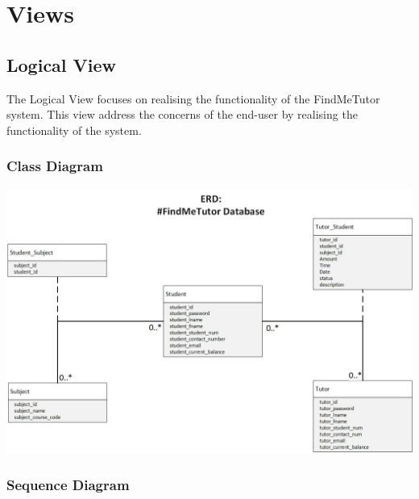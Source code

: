 \documentclass[12pt]{article}
\begin{document}
\section{Views}
\subsection{Logical View}

The Logical View focuses on realising the functionality of the FindMeTutor system.
This view address the concerns of the end-user by realising the functionality of the system.\\

\subsubsection{Class Diagram}
\includegraphics[width=140mm]{./class_diagram_findme_tutor.jpg}
\subsubsection{Sequence Diagram}
\end{document}
